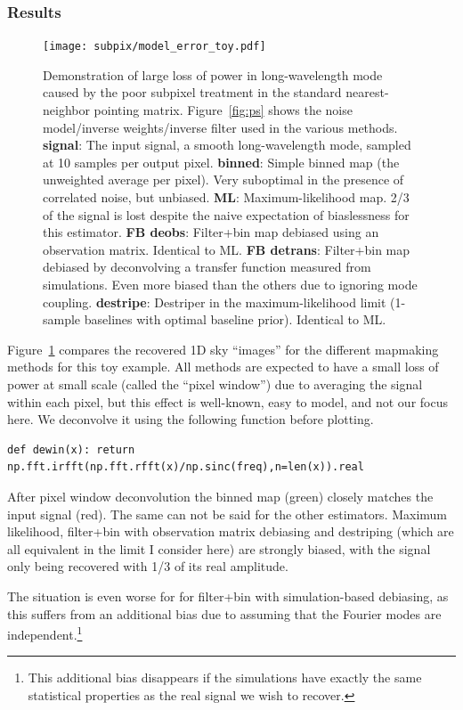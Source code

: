 \documentclass[twocolumn,apj]{aastex63}
\newcommand{\dfn}[1]{\textbf{#1}}
\begin{document}
\subsubsection{Results}
\begin{figure}
	\centering
	\texttt{[image: subpix/model\_error\_toy.pdf]}
	\caption{
		Demonstration of large loss of power in long-wavelength mode
		caused by the poor subpixel treatment in the standard nearest-neighbor pointing matrix.
		Figure~\ref{fig:ps} shows the noise model/inverse weights/inverse filter
		used in the various methods.
		\dfn{signal}: The input signal, a smooth long-wavelength mode,
		sampled at 10 samples per output pixel.
		\dfn{binned}: Simple binned map (the unweighted average per pixel).
		Very suboptimal in the presence of correlated noise, but unbiased.
		\dfn{ML}: Maximum-likelihood map. 2/3 of the signal is lost despite
		the naive expectation of biaslessness for this estimator.
		\dfn{FB deobs}: Filter+bin map debiased using an observation matrix.
		Identical to ML.
		\dfn{FB detrans}: Filter+bin map debiased by deconvolving a
		transfer function measured from simulations. Even more biased
		than the others due to ignoring mode coupling.
		\dfn{destripe}: Destriper in the maximum-likelihood limit
		(1-sample baselines with optimal baseline prior). Identical to ML.
	}
	\label{fig:subpix-bias}
\end{figure}

Figure~\ref{fig:subpix-bias} compares the recovered 1D sky ``images''
for the different mapmaking methods for this toy example. All methods
are expected to have a small loss of power at small scale (called
the ``pixel window'') due to averaging the signal within each pixel,
but this effect is well-known, easy to model, and not our focus here.
We deconvolve it using the following function before plotting.
\begin{lstlisting}
def dewin(x): return np.fft.irfft(np.fft.rfft(x)/np.sinc(freq),n=len(x)).real
\end{lstlisting}
After pixel window deconvolution the binned map (green) closely matches the
input signal (red). The same can not be said for the other estimators.
Maximum likelihood, filter+bin with observation matrix debiasing and destriping
(which are all equivalent in the limit I consider here) are strongly biased,
with the signal only being recovered with 1/3 of its real amplitude.

The situation is even worse for for filter+bin with simulation-based debiasing,
as this suffers from an additional bias due to assuming that the Fourier modes
are independent.\footnote{This additional bias disappears if the simulations
have exactly the same statistical properties as the real signal we wish to
recover.}
\end{document}

